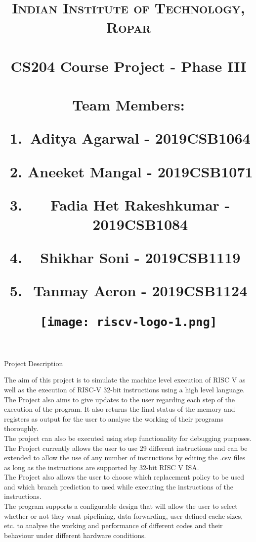 \documentclass{article}
\title{
\normalfont \large 
\textsc{Indian Institute of Technology, Ropar} \\    [40pt] 
\horrule{} \\[0.4cm] 
\Huge CS204 Course Project - Phase III\\ 
\horrule{} \\[0.5cm]
\protect\vspace{2.0cm}
\large
\textup{Team Members:}\\\vspace{1cm}
\begin{centering}
\begin{enumerate}
    \item Aditya Agarwal - 2019CSB1064
    \item Aneeket Mangal - 2019CSB1071
    \item Fadia Het Rakeshkumar - 2019CSB1084
    \item Shikhar Soni - 2019CSB1119
    \item Tanmay Aeron - 2019CSB1124
\end{enumerate}
\end{centering}
\date{}
\centering
\protect\vspace{4.0cm}
\texttt{[image: riscv-logo-1.png]}
}
\begin{document}
\maketitle
\newpage
\begin{centering}
\begin{Huge}
\textsf{Project Description}\\
\end{Huge}
\end{centering}
\protect\vspace{2.0cm}
\LARGE
The aim of this project is to simulate the machine level execution of RISC V as well as the execution of RISC-V 32-bit instructions using a high level language.\\

The Project also aims to give updates to the user regarding each step of the execution of the program. It also returns the final status of the memory and registers as output for the user to analyse the working of their programs thoroughly.\\

The project can also be executed using step functionality for debugging purposes.\\

The Project currently allows the user to use 29 different instructions and can be extended to allow the use of any number of instructions by editing the .csv files as long as the instructions are supported by 32-bit RISC V ISA. \\

The Project also allows the user to choose which replacement policy to be used and which branch prediction to used while executing the instructions of the instructions.\\

The program supports a configurable design that will allow the user to select whether or not they want pipelining, data forwarding, user defined cache sizes, etc. to analyse the working and performance of different codes and their behaviour under different hardware conditions.\\
\end{document}
